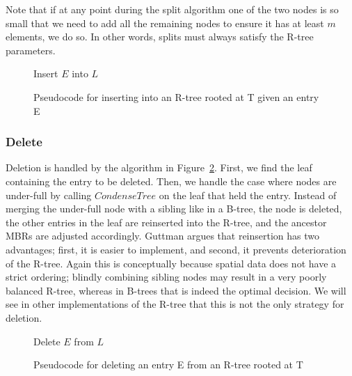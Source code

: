 Note that if at any point during the split algorithm one of the two nodes is so small
that we need to add all the remaining nodes to ensure it has at least $m$ elements,
we do so. In other words, splits must always satisfy the R-tree parameters.

\begin{figure}[t]
\begin{algorithmic}
		\State {}
			\State Insert $E$ into $L$
		\Else
			\State {}
		\EndIf
		\State {}
	\EndFunction
\end{algorithmic}
\caption{Pseudocode for inserting into an R-tree rooted at T given an entry E}
\label{fig:R_Tree_Insert}
\end{figure}

\subsubsection{Delete}
Deletion is handled by the algorithm in Figure~\ref{fig:R_Tree_Delete}. First,
we find the leaf containing the entry to be deleted. Then, we handle the case
where nodes are under-full by calling $CondenseTree$ on the leaf that held
the entry. Instead of merging the under-full node with a sibling like in a 
B-tree, the node is deleted, the other entries in the leaf are reinserted into 
the R-tree, and the ancestor MBRs are adjusted accordingly. Guttman argues that
reinsertion has two advantages; first, it is easier to implement, and second, 
it prevents deterioration of the R-tree.
Again this is conceptually because spatial data does not have a strict ordering;
blindly combining sibling nodes
may result in a very poorly balanced R-tree, whereas in B-trees that is 
indeed the optimal decision. We will see in other implementations
of the R-tree that this is not the only strategy for deletion.

\begin{figure}[t]
\begin{algorithmic}
	\State {}
	\State Delete $E$ from $L$
	\State {}
\EndFunction
\end{algorithmic}
\caption{Pseudocode for deleting an entry E from an R-tree rooted at T}
\label{fig:R_Tree_Delete}
\end{figure}


